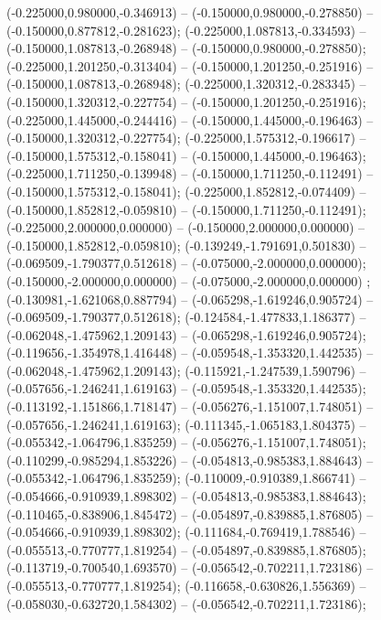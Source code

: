  (-0.225000,0.980000,-0.346913) -- (-0.150000,0.980000,-0.278850) -- (-0.150000,0.877812,-0.281623);
 (-0.225000,1.087813,-0.334593) -- (-0.150000,1.087813,-0.268948) -- (-0.150000,0.980000,-0.278850);
 (-0.225000,1.201250,-0.313404) -- (-0.150000,1.201250,-0.251916) -- (-0.150000,1.087813,-0.268948);
 (-0.225000,1.320312,-0.283345) -- (-0.150000,1.320312,-0.227754) -- (-0.150000,1.201250,-0.251916);
 (-0.225000,1.445000,-0.244416) -- (-0.150000,1.445000,-0.196463) -- (-0.150000,1.320312,-0.227754);
 (-0.225000,1.575312,-0.196617) -- (-0.150000,1.575312,-0.158041) -- (-0.150000,1.445000,-0.196463);
 (-0.225000,1.711250,-0.139948) -- (-0.150000,1.711250,-0.112491) -- (-0.150000,1.575312,-0.158041);
 (-0.225000,1.852812,-0.074409) -- (-0.150000,1.852812,-0.059810) -- (-0.150000,1.711250,-0.112491);
 (-0.225000,2.000000,0.000000) -- (-0.150000,2.000000,0.000000) -- (-0.150000,1.852812,-0.059810);
 (-0.139249,-1.791691,0.501830) -- (-0.069509,-1.790377,0.512618) -- (-0.075000,-2.000000,0.000000);
 (-0.150000,-2.000000,0.000000) -- (-0.075000,-2.000000,0.000000) ;
 (-0.130981,-1.621068,0.887794) -- (-0.065298,-1.619246,0.905724) -- (-0.069509,-1.790377,0.512618);
 (-0.124584,-1.477833,1.186377) -- (-0.062048,-1.475962,1.209143) -- (-0.065298,-1.619246,0.905724);
 (-0.119656,-1.354978,1.416448) -- (-0.059548,-1.353320,1.442535) -- (-0.062048,-1.475962,1.209143);
 (-0.115921,-1.247539,1.590796) -- (-0.057656,-1.246241,1.619163) -- (-0.059548,-1.353320,1.442535);
 (-0.113192,-1.151866,1.718147) -- (-0.056276,-1.151007,1.748051) -- (-0.057656,-1.246241,1.619163);
 (-0.111345,-1.065183,1.804375) -- (-0.055342,-1.064796,1.835259) -- (-0.056276,-1.151007,1.748051);
 (-0.110299,-0.985294,1.853226) -- (-0.054813,-0.985383,1.884643) -- (-0.055342,-1.064796,1.835259);
 (-0.110009,-0.910389,1.866741) -- (-0.054666,-0.910939,1.898302) -- (-0.054813,-0.985383,1.884643);
 (-0.110465,-0.838906,1.845472) -- (-0.054897,-0.839885,1.876805) -- (-0.054666,-0.910939,1.898302);
 (-0.111684,-0.769419,1.788546) -- (-0.055513,-0.770777,1.819254) -- (-0.054897,-0.839885,1.876805);
 (-0.113719,-0.700540,1.693570) -- (-0.056542,-0.702211,1.723186) -- (-0.055513,-0.770777,1.819254);
 (-0.116658,-0.630826,1.556369) -- (-0.058030,-0.632720,1.584302) -- (-0.056542,-0.702211,1.723186);
